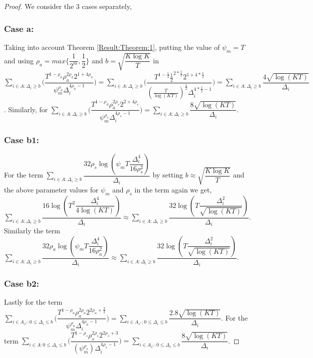 \begin{proof}
We consider the $3$ cases separately,
\subsubsection{Case a:}
Taking into account Theorem \ref{Result:Theorem:1}, putting the value of $\psi_{m}=T$ and using $\rho_{a}=max\bigg\lbrace\dfrac{1}{2^{m}},\dfrac{1}{2}\bigg\rbrace$ and $b=\sqrt{\dfrac{K\log K}{T}}$ in $\sum_{i\in A:\Delta_{i}\geq b}\bigg(\dfrac{T^{1-\rho_{a}}\rho_{a}^{2\rho_{a}}2^{1+4\rho_{a}}}{\psi_{m}^{\rho_{a}}\Delta_{i}^{4\rho_{a}-1}} \bigg)= \sum_{i\in A:\Delta_{i}\geq b}\bigg(\dfrac{T^{1-\frac{1}{2}}\frac{1}{2}^{2*\frac{1}{2}}2^{1+4*\frac{1}{2}}}{(\frac{T}{\log (KT)})^{\frac{1}{2}}\Delta_{i}^{4*\frac{1}{2}-1}} \bigg)=\sum_{i\in A:\Delta_{i}\geq b}\dfrac{4\sqrt{\log (KT)}}{\Delta_{i}}$. Similarly, for $\sum_{i\in A:\Delta_{i}\geq b}\bigg(\dfrac{T^{1-\rho_{S}}\rho_{a}^{2\rho_{s}}2^{2+4\rho_{s}}}{\psi_{m}^{\rho_{s}}\Delta_{i}^{4\rho_{s}-1}} \bigg) = \sum_{i\in A:\Delta_{i}\geq b}\dfrac{8\sqrt{\log (KT)}}{\Delta_{i}}$.
\subsubsection{Case b1:}
\par For the term $\sum_{i\in A:\Delta_{i}\geq b}\dfrac{32\rho_{s}\log{(\psi_{m}T\dfrac{\Delta_{i}^{4}}{16\rho_{s}^{2}})}}{\Delta_{i}}$ by setting $b\approx \sqrt{\dfrac{K\log K}{T}}$ and the above parameter values for $\psi_{m}$ and $\rho_{s}$  in the term again we get,
$\sum_{i\in A:\Delta_{i}\geq b}\dfrac{16\log{(T^{2}\dfrac{\Delta_{i}^{4}}{4\log (KT)})}}{\Delta_{i}}\approx \sum_{i\in A:\Delta_{i}\geq b}\dfrac{32\log{(T\dfrac{\Delta_{i}^{2}}{\sqrt{\log (KT)}})}}{\Delta_{i}}$. Similarly the term $\sum_{i\in A:\Delta_{i}\geq b}\dfrac{32\rho_{a}\log{(\psi_{m}T\dfrac{\Delta_{i}^{4}}{16\rho_{a}^{2}})}}{\Delta_{i}}\approx \sum_{i\in A:\Delta_{i}\geq b}\dfrac{32\log{(T\dfrac{\Delta_{i}^{2}}{\sqrt{\log (KT)}})}}{\Delta_{i}}$.
\subsubsection{Case b2:}
\par Lastly for the term $\sum\limits_{i\in A_{s^{*}}:0\leq\Delta_{i}\leq b}\bigg(\dfrac{T^{1-\rho_{a}}\rho_{a}^{2\rho_{a}}2^{2\rho_{a}+\frac{3}{2}}}{\psi_{m}^{\rho_{a}}\Delta_{i}^{4\rho_{a}-1}} \bigg)= \sum\limits_{i\in A_{s^{*}}:0\leq\Delta_{i}\leq b}\dfrac{2.8\sqrt{\log (KT)}}{\Delta_{i}}$. For the term $\sum\limits_{i\in A:0\leq\Delta_{i}\leq b}\bigg(\dfrac{T^{1-\rho_{s}}\rho_{s}^{2\rho_{s}}2^{2\rho_{s}+3}}{(\psi_{m}^{\rho_{s}})\Delta_{i}^{4\rho_{s} -1}} \bigg)=\sum\limits_{i\in A_{s^{*}}:0\leq\Delta_{i}\leq b}\dfrac{8\sqrt{\log (KT)}}{\Delta_{i}}$.


\end{proof}

